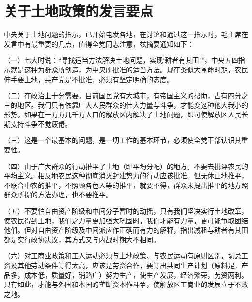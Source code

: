 \section[关于土地政策的发言要点（一九四六年五月八日）]{关于土地政策的发言要点}


中央关于土地问题的指示，已开始电发各地，在讨论和通过这一指示时，毛主席在发言中有最重要的几点，值得全党同志注意，兹摘要通知如下：

（一）七大时说：“寻找适当方法解决土地问题，实现‘耕者有其田’”。中央五四指示就是这种为群众所创造，为中央所批准的适当方法。现在类似大革命时期，农民伸手要土地，共产党是不批准，必须有坚定明确的态度。

（二）在政治上十分需要。目前国民党有大城市，有帝国主义的帮助，占有四分之三的地区。我们只有依靠广大人民群众的伟大力量与斗争，才能变这种他大我小的形势。如果在一万万几千万人口的解放区内解决了土地问题，即可使解放区人民长期支持斗争不觉疲倦。

（三）这是一个最基本的问题，是一切工作的基本环节，必须使全党干部认识其重要性。

（四）由于广大群众的行动推平了土地（即平均分配）的地方，不要去批评农民的平均主义。相反地农民这种彻底消灭封建势力的行动应该批准。但无休止地推平，不联合中农的推平，不照顾各色人等的推平，就要不得，群众未提出推平的地方照群众所提的方法办理，也不要推平。

（五）不要怕自由资产阶级和中间分子暂时的动摇，只有我们坚决实行土地改革，使农民得到土地，我们之力量更加强大巩固时，我们才能有力量，更可能争取团结他们。但对自由资产阶级及中间派应作正确而有力的解释，指出减租与耕者有其田都是实行政协决议，其方式又与内战时期大不相同。

（六）对工商业政策和工人运动必须与土地政策、与农民运动有原则区别，切忌工资及其他劳动条件订得太高，应该是劳资合作，要订出共同生产计划（原料足，产品多，成本低，质量好，销路广）努力生产，使生产发展，经济繁荣，劳资两利。只有如此，才能与外国和本国的垄断资本作斗争，使解放区工商业的发展立于不败之地。

